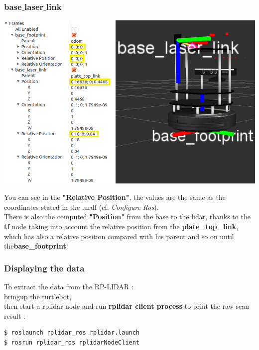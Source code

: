 \documentclass[10pt,a4paper]{article}
\begin{document}
\subsubsection{base$\_$laser$\_$link} 
\begin{center}
\includegraphics[width=\textwidth]{images/tf_coordinates_small.png}\\
\end{center}

You can see in the \textbf{"Relative Position"}, the values are the same as the coordinates stated in the .urdf (cf. \textit{Configure Ros}).\\
There is also the computed \textbf{"Position"} from the base to the lidar, thanks to the \textbf{tf} node taking into account the relative position from the \textbf{plate\_top\_link}, which has also a relative position compared with his parent and so on until the\textbf{base\_footprint}. \\

\subsubsection{Displaying the data}
To extract the data from the RP-LIDAR :\\
bringup the turtlebot, \\
then start a rplidar node and run \textbf{rplidar client process} to print the raw scan result :
\begin{lstlisting}[frame=single] 
$ roslaunch rplidar_ros rplidar.launch
$ rosrun rplidar_ros rplidarNodeClient
\end{lstlisting}

\begin{center}
\end{center}
\end{document}

